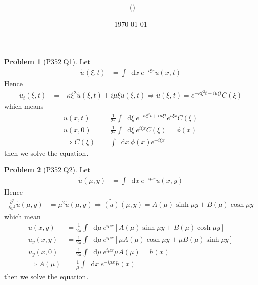 \documentclass[twoside,11pt]{article}
\title{{\sffamily \Code \ \Ass}}
\author{\sffamily \name \ (\href{mailto:\mail}{\mail})}
\date{\sffamily \today}
\makeatletter
\renewcommand*\d{\mathop{}\!\mathrm{d}}
\theoremstyle{definition}
\newtheorem{problem}{Problem}
\theoremstyle{remark}
\newtheorem*{remark}{Remark}
\renewcommand{\maketitle}{\bgroup\setlength{\parindent}{0pt}
\begin{flushleft}
  \textbf{\Large\@title}

  \@author
\end{flushleft}\egroup
}
\makeatother
\begin{document}
\maketitle
\thispagestyle{title}


\begin{problem}[P352 Q1]
Let 
\begin{align*}
    \tilde{u}(\xi, t) &= 
    \int\d x \ e^{-i\xi x} u(x, t)
\end{align*}
Hence
\begin{align*}
    \tilde{u}_t(\xi, t) &= -\kappa\xi^2\tilde{u}(\xi, t)
    + i\mu\xi\tilde{u}(\xi, t)
    \Rightarrow
    \tilde{u}(\xi, t) =
    e^{-\kappa\xi^2 t + i\mu\xi t}C(\xi)
\end{align*}
which means
\begin{align*}
    u(x, t) &= 
    \frac{1}{2\pi}\int\d\xi\ e^{-\kappa\xi^2 t + i\mu\xi t} e^{i\xi x}C(\xi)\\
    u(x, 0) &= 
    \frac{1}{2\pi}\int\d\xi\ e^{i\xi x}C(\xi) = \phi(x)\\
    \Rightarrow C(\xi) &= \int\d x\ \phi(x)e^{-i\xi x}
\end{align*}
then we solve the equation.

\end{problem}


\begin{problem}[P352 Q2]
Let
\begin{align*}
    \tilde{u}(\mu, y) &= 
    \int\d x\ e^{-i\mu x}u(x, y)
\end{align*}
Hence
\begin{align*}
    \frac{\partial^2}{\partial y^2}\tilde{u}(\mu, y) &= 
    \mu^2\tilde{u}(\mu, y)\Rightarrow
    \tilde{(u)}(\mu, y) = A(\mu)\sinh\mu y + B(\mu)\cosh\mu y
\end{align*}
which mean
\begin{align*}
    u(x, y) &= \frac{1}{2\pi}\int\d\mu\ e^{i\mu x}[A(\mu)\sinh\mu y + B(\mu)\cosh\mu y]\\
    u_y(x, y) &= \frac{1}{2\pi}\int\d\mu\ e^{i\mu x}[\mu A(\mu)\cosh\mu y + \mu B(\mu)\sinh\mu y]\\
    u_y(x, 0) &= \frac{1}{2\pi}\int\d\mu\ e^{i\mu x}\mu A(\mu) = h(x)\\
    \Rightarrow A(\mu) &= \frac{1}{\mu}\int\d x\ e^{-i\mu x}h(x)
\end{align*}
then we solve the equation.


\end{problem}





\end{document}
